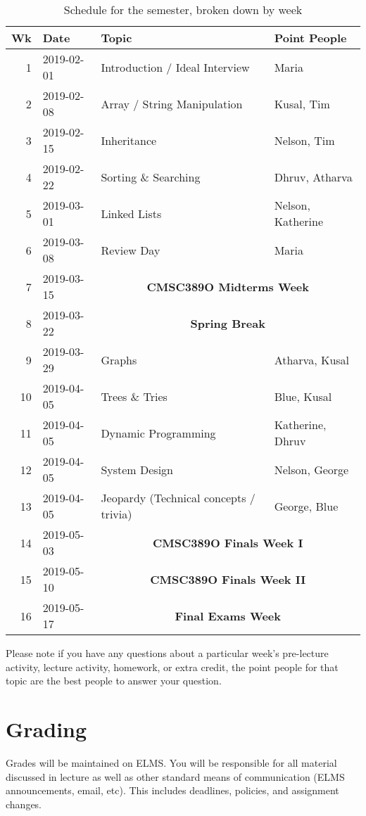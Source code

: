 \documentclass[12pt]{article}
\begin{document}
\begin{table}[hbt!]
  \begin{tabular}{@{}rlll}
    Wk & Date & Topic & Point People \\
    \hline
    1 & 2019-02-01 & Introduction / Ideal Interview & Maria \\
    2 & 2019-02-08 & Array / String Manipulation    & Kusal, Tim \\
    3 & 2019-02-15 & Inheritance                    & Nelson, Tim \\
    4 & 2019-02-22 & Sorting \& Searching           & Dhruv, Atharva \\
    5 & 2019-03-01 & Linked Lists                   & Nelson, Katherine \\
    6 & 2019-03-08 & Review Day                     & Maria \\
    7 & 2019-03-15 & \multicolumn{2}{c}{\textbf{CMSC389O Midterms Week}} \\
    8 & 2019-03-22 & \multicolumn{2}{c}{\textbf{Spring Break}} \\
    9 & 2019-03-29 & Graphs                         & Atharva, Kusal \\
    10& 2019-04-05 & Trees \& Tries                 & Blue, Kusal \\
    11& 2019-04-05 & Dynamic Programming            & Katherine, Dhruv \\
    12& 2019-04-05 & System Design                  & Nelson, George \\
    13& 2019-04-05 & Jeopardy (Technical concepts / trivia) & George, Blue \\
    14& 2019-05-03 & \multicolumn{2}{c}{\textbf{CMSC389O Finals Week I}} \\
    15& 2019-05-10 & \multicolumn{2}{c}{\textbf{CMSC389O Finals Week II}} \\
    16& 2019-05-17 & \multicolumn{2}{c}{\textbf{Final Exams Week}}
  \end{tabular}
  \caption{Schedule for the semester, broken down by week}
  \label{tab:schedule}
\end{table}

Please note if you have any questions about a particular week’s pre-lecture activity, lecture activity, homework, or extra credit, the point people for that topic are the best people to answer your question.

\section*{Grading}
\noindent Grades will be maintained on ELMS.
You will be responsible for all material discussed in lecture as well as other standard means of communication (ELMS announcements, email, etc).
This includes deadlines, policies, and assignment changes.
\end{document}
